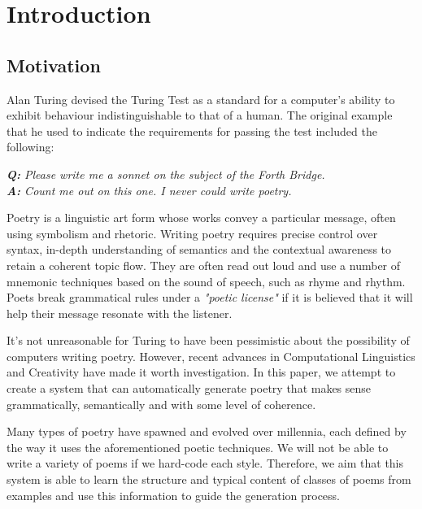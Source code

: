 \chapter{Introduction}
\ifpdf
    \graphicspath{{Introduction/IntroductionFigs/PNG/}{Introduction/IntroductionFigs/PDF/}{Introduction/IntroductionFigs/}}
\else
    \graphicspath{{Introduction/IntroductionFigs/EPS/}{Introduction/IntroductionFigs/}}
\fi

\section{Motivation}
Alan Turing devised the Turing Test as a standard for a computer's ability to exhibit behaviour indistinguishable to that of a human. The original example that he used to indicate the requirements for passing the test included the following\cite{turing1950computing}:

\textit{\textbf{Q:} Please write me a sonnet on the subject of the Forth Bridge.}\\
\textit{\textbf{A:} Count me out on this one. I never could write poetry.}

Poetry is a linguistic art form whose works convey a particular message, often using symbolism and rhetoric. Writing poetry requires precise control over syntax, in-depth understanding of semantics and the contextual awareness to retain a coherent topic flow. They are often read out loud and use a number of mnemonic techniques based on the sound of speech, such as rhyme and rhythm.  Poets break grammatical rules under a \textit{"poetic license"} if it is believed that it will help their message resonate with the listener.

It's not unreasonable for Turing to have been pessimistic about the possibility of computers writing poetry. However, recent advances in Computational Linguistics and Creativity have made it worth investigation. In this paper, we attempt to create a system that can automatically generate poetry that makes sense grammatically, semantically and with some level of coherence.

Many types of poetry have spawned and evolved over millennia, each defined by the way it uses the aforementioned poetic techniques. We will not be able to write a variety of poems if we hard-code each style. Therefore, we aim that this system is able to learn the structure and typical content of classes of poems from examples and use this information to guide the generation process.

